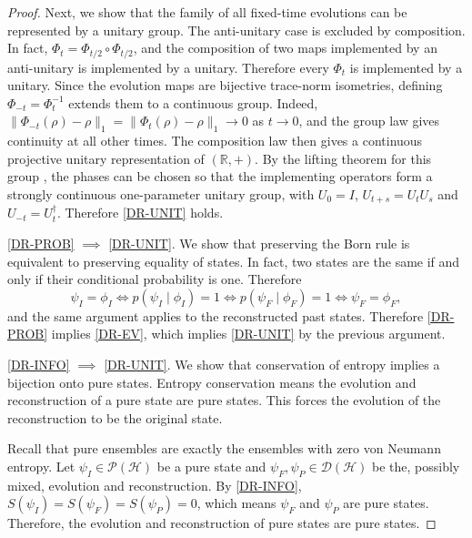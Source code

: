 \documentclass[entropy,article,submit,moreauthors]{Definitions/mdpi}
\begin{document}
\begin{proof}
	Next, we show that the family of all fixed-time evolutions can be represented by a unitary group. The anti-unitary case is excluded by composition. In fact, $\Phi_t=\Phi_{t/2}\circ \Phi_{t/2}$, and the composition of two maps implemented by an anti-unitary is implemented by a unitary. Therefore every $\Phi_t$ is implemented by a unitary. Since the evolution maps are bijective trace-norm isometries, defining $\Phi_{-t}=\Phi_t^{-1}$ extends them to a continuous group. Indeed, $\|\Phi_{-t}(\rho)-\rho\|_1=\|\Phi_t(\rho)-\rho\|_1\to0$ as $t\to0$, and the group law gives continuity at all other times. The composition law then gives a continuous projective unitary representation of $(\mathbb{R},+)$. By the lifting theorem for this group \cite[Theorem~5.59]{Landsman2017}, the phases can be chosen so that the implementing operators form a strongly continuous one-parameter unitary group, with $U_0=I$, $U_{t+s}=U_tU_s$ and $U_{-t}=U_t^\dagger$. Therefore \ref{DR-UNIT} holds.
	
	\ref{DR-PROB} $\implies$ \ref{DR-UNIT}. We show that preserving the Born rule is equivalent to preserving equality of states. In fact, two states are the same if and only if their conditional probability is one. Therefore
	\begin{equation}
		\psi_I=\phi_I
		\iff p(\psi_I\mid\phi_I)=1
		\iff p(\psi_F\mid\phi_F)=1
		\iff \psi_F=\phi_F,
	\end{equation}
	and the same argument applies to the reconstructed past states. Therefore \ref{DR-PROB} implies \ref{DR-EV}, which implies \ref{DR-UNIT} by the previous argument.
	
	\ref{DR-INFO} $\implies$ \ref{DR-UNIT}. We show that conservation of entropy implies a bijection onto pure states. Entropy conservation means the evolution and reconstruction of a pure state are pure states. This forces the evolution of the reconstruction to be the original state.
	
	Recall that pure ensembles are exactly the ensembles with zero von Neumann entropy. Let $\psi_I \in \mathcal{P}(\mathcal{H})$ be a pure state and $\psi_F, \psi_P \in \mathcal{D}(\mathcal{H})$ be the, possibly mixed, evolution and reconstruction. By \ref{DR-INFO}, $S(\psi_I)=S(\psi_F)=S(\psi_P)=0$, which means $\psi_F$ and $\psi_P$ are pure states. Therefore, the evolution and reconstruction of pure states are pure states.
	

\end{proof}
\end{document}
